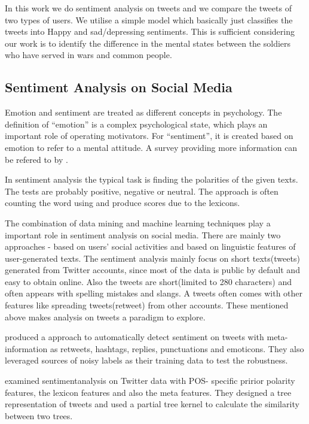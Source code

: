 In this work we do sentiment analysis on tweets and we compare the tweets of
two types of users. We utilise a simple model which basically just classifies
the tweets into Happy and sad/depressing sentiments. This is sufficient
considering our work is to identify the difference in the mental states between
the soldiers who have served in wars and common people.

\subsection{Sentiment Analysis on Social Media}

Emotion and sentiment are treated as different concepts in psychology. The
definition of \enquote{emotion} is a complex psychological state, which plays an
important role of operating motivators. For \enquote{sentiment}, it is created based on
emotion to refer to a mental attitude. A survey providing more information can
be refered to by \cite{yue2018survey}.

In sentiment analysis the typical task is finding the polarities of the given
texts. The tests are probably positive, negative or neutral. The approach is
often counting the word using and produce scores due to the lexicons.

The combination of data mining and machine learning techniques play a important
role in sentiment analysis on social media. There are mainly two approaches -
based on users' social activities and based on linguistic features of
user-generated texts. The sentiment analysis mainly focus on short texts(tweets)
generated from Twitter accounts, since most of the data is public by default and
easy to obtain online. Also the tweets are short(limited to 280 characters) and
often appears with spelling mistakes and slangs. A tweets often comes with other
features like spreading tweets(retweet) from other accounts. These mentioned
above makes analysis on tweets a paradigm to explore.

\cite{robustTwitter2010Luciano} produced a approach to automatically detect
sentiment on tweets with meta-information as retweets, hashtags, replies,
punctuations and emoticons. They also leveraged sources of noisy
labels as their training data to test the robustness.

\cite{agarwal2011sentiment} examined sentimentanalysis on Twitter data with POS-
specific pririor polarity features, the lexicon features and also the meta
features. They designed a tree representation of tweets and used a partial tree
kernel to calculate the similarity between two trees.

